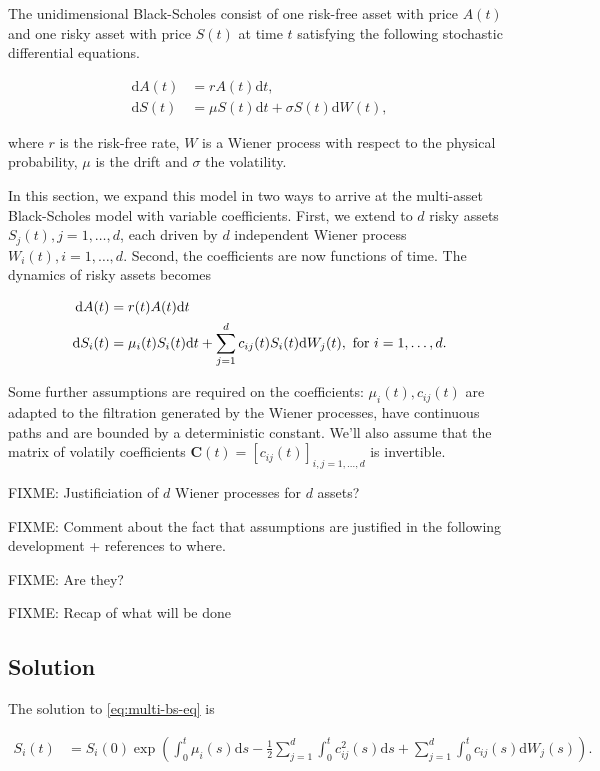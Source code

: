 \documentclass[a4paper]{article}
\begin{document}
The unidimensional Black-Scholes consist of one risk-free asset with price $A(t)$ and one risky asset with price $S(t)$ at time $t$ satisfying the following stochastic differential equations.

\begin{align*}
  \mathrm{d}A(t) &= r A(t) \mathrm{d}t,\\
  \mathrm{d}S(t) &= \mu S(t) \mathrm{d}t + \sigma S(t) \mathrm{d}W(t),
\end{align*}

where $r$ is the risk-free rate, $W$ is a Wiener process with respect to the physical probability, $\mu$ is the drift and $\sigma$ the volatility.

In this section, we expand this model in two ways to arrive at the multi-asset Black-Scholes model with variable coefficients. First, we extend to $d$ risky assets $S_j(t), j =  1, \ldots, d$, each driven by $d$ independent Wiener process $W_i(t), i = 1, \ldots, d$. Second, the coefficients are now functions of time. The dynamics of risky assets becomes

\begin{align}
  \mathrm{d}A(t) &= r(t) A(t) \mathrm{d}t\notag\\
  \mathrm{d}S_i(t) &= \mu_i(t) S_i(t) \mathrm{d}t + \sum_{j=1}^{d} c_{ij}(t) S_i(t) \mathrm{d}W_j(t), \text{ for } i = 1,\ldots,d.\label{eq:multi-bs-eq}
\end{align}

Some further assumptions are required on the coefficients: $\mu_i(t), c_{ij}(t)$ are adapted to the filtration generated by the Wiener processes, have continuous paths and are bounded by a deterministic constant. We'll also assume that the matrix of volatily coefficients $\mathbf{C}(t) = [c_{ij}(t)]_{i,j=1,\ldots,d}$ is invertible.

FIXME: Justificiation of $d$ Wiener processes for $d$ assets?

FIXME: Comment about the fact that assumptions are justified in the following development + references to where.

FIXME: Are they?

FIXME: Recap of what will be done

\subsection{Solution}

The solution to \eqref{eq:multi-bs-eq} is

\begin{align*}
  S_i(t) &= S_i(0) \exp \left( \int_0^t \mu_i(s) \mathrm{d}s - \frac{1}{2} \sum_{j=1}^{d} \int_0^t c_{ij}^2(s) \mathrm{d}s + \sum_{j=1}^d \int_0^t c_{ij}(s) \mathrm{d}W_j(s) \right).
\end{align*}
\end{document}
